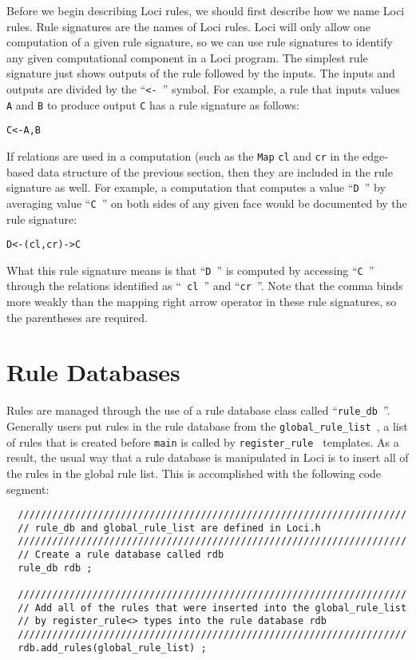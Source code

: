 \documentclass[10pt,epsf]{book}
\begin{document}
Before we begin describing Loci rules, we should first describe how we
name Loci rules.  Rule signatures are the names of Loci rules.  Loci
will only allow one computation of a given rule signature, so we can
use rule signatures to identify any given computational component in a
Loci program.  The simplest rule signature just shows outputs of the
rule followed by the inputs.  The inputs and outputs are divided by
the ``{\tt <- }'' symbol.  For example, a rule that inputs values {\tt
  A} and {\tt B} to produce output {\tt C} has a rule signature as
follows:

\begin{verbatim}
C<-A,B
\end{verbatim}

If relations are used in a computation (such as the {\tt Map} {\tt cl}
and {\tt cr} in the edge-based data structure of the previous section,
then they are included in the rule signature as well.  For example, a
computation that computes a value ``{\tt D }'' by averaging value
``{\tt C }'' on both sides of any given face would be documented by
the rule signature:

\begin{verbatim}
D<-(cl,cr)->C
\end{verbatim}

What this rule signature means is that ``{\tt D }'' is computed by
accessing ``{\tt C }'' through the relations identified as ``{\tt
  cl }'' and ``{\tt cr }''.  Note that the comma binds more weakly than
the mapping right arrow operator in these rule signatures, so the
parentheses are required.

\section{Rule Databases}

Rules are managed through the use of a rule database class called
``{\tt rule\_db }''.  Generally users put rules in the rule database
from the {\tt global\_rule\_list }, a list of rules that is created
before {\tt main} is called by {\tt register\_rule } templates.  As a
result, the usual way that a rule database is manipulated in Loci is
to insert all of the rules in the global rule list.  This is
accomplished with the following code segment: 

\begin{verbatim}
  ////////////////////////////////////////////////////////////////////
  // rule_db and global_rule_list are defined in Loci.h
  ////////////////////////////////////////////////////////////////////
  // Create a rule database called rdb
  rule_db rdb ;

  ////////////////////////////////////////////////////////////////////
  // Add all of the rules that were inserted into the global_rule_list
  // by register_rule<> types into the rule database rdb
  ////////////////////////////////////////////////////////////////////
  rdb.add_rules(global_rule_list) ;
\end{verbatim}
\end{document}
